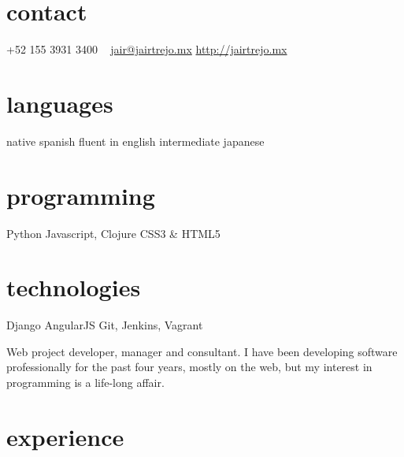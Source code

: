 \documentclass[]{friggeri-cv} %
\def\mystar{{\FA \faStar}}
\begin{document}


\begin{aside} %
\section{contact}
+52 155 3931 3400
~
\href{mailto:jair@jairtrejo.mx}{jair@jairtrejo.mx}
\href{http://jairtrejo.mx}{http://jairtrejo.mx}
\section{languages}
native spanish
fluent in english
intermediate japanese
\section{programming}
{\color{red} \mystar} Python
Javascript, Clojure
CSS3 \& HTML5
\section{technologies}
Django
AngularJS
Git, Jenkins, Vagrant
\end{aside}

Web project developer, manager and consultant. I have been developing software professionally for the past four years, mostly on the web, but my interest in programming is a life-long affair.


\section{experience}

\begin{entrylist}

\end{entrylist}

\end{document}
